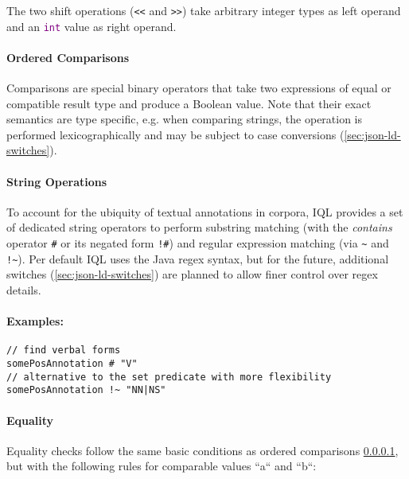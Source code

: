 \documentclass[11pt,a4paper,portrait]{article}
\newcommand{\iql}{IQL\xspace}
\newcommand{\keyword}[1]{\textcolor{purple}{\texttt{#1}}}
\begin{document}
The two shift operations (\texttt{\textless{}\textless} and \texttt{\textgreater{}\textgreater}) take arbitrary integer types as left operand and an \keyword{int} value as right operand.

\paragraph{Ordered Comparisons}
\label{sec:ordered-comparisons}

Comparisons are special binary operators that take two expressions of equal or compatible result type and produce a Boolean value. Note that their exact semantics are type specific, e.g. when comparing strings, the operation is performed lexicographically and may be subject to case conversions (\ref{sec:json-ld-switches}).

\paragraph{String Operations}
\label{sec:string-operations}

To account for the ubiquity of textual annotations in corpora, \iql provides a set of dedicated string operators to perform substring matching (with the \textit{contains} operator \texttt{\#} or its negated form \texttt{!\#}) and regular expression matching (via \texttt{\textasciitilde} and \texttt{!\textasciitilde}). Per default \iql uses the Java regex syntax, but for the future, additional switches (\ref{sec:json-ld-switches}) are planned to allow finer control over regex details.

\paragraph{Examples:}

\begin{verbatim}
// find verbal forms
somePosAnnotation # "V"       
// alternative to the set predicate with more flexibility
somePosAnnotation !~ "NN|NS"   
\end{verbatim}

\paragraph{Equality}
\label{sec:equality}

Equality checks follow the same basic conditions as ordered comparisons \cref{sec:ordered-comparisons}, but with the following rules for comparable values ``a`` and ``b``:
\end{document}
